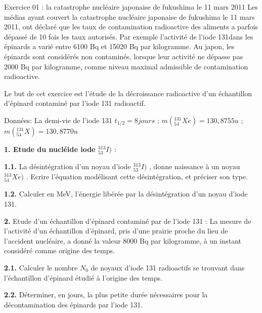 \documentclass[12pt, french]{article}
\begin{document}
\begin{center}
\end{center}

\vspace{-0.2cm}



\begin{Box2}{Exercice 01 : la catastrophe nucléaire japonaise de fukushima le 11 mars 2011  }
	Les médias ayant couvert la catastrophe nucléaire japonaise de fukushima le 11 mars 2011, ont déclaré
que les taux de contamination radioactive des aliments a parfois dépassé de 10 fois les taux autorisés.
Par exemple l’activité de l’iode 131dans les épinards a varié entre 6100 Bq et 15020 Bq par
kilogramme. Au japon, les épinards sont considérés non contaminés, lorsque leur activité ne dépasse
pas 2000 Bq par kilogramme, comme niveau maximal admissible de contamination radioactive.

Le but de cet exercice est l’étude de la décroissance radioactive d’un échantillon d’épinard contaminé
par l’iode 131 radioactif. 

Données: La demi-vie de l’iode 131 $t_{1/2}=8jours$ ; $m(^{131}_{54}Xe)=130,8755u $ ; $m(^{131}_{54}X)=130,8770u $

\textbf{1. Etude du nucléide iode $^{313}_{53}I)$ } : 

\textbf{1.1. }La désintégration d’un noyau d’iode $^{313}_{53}I)$ , donne naissance à un noyau $^{313}_{54}Xe)$ . Ecrire l’équation modélisant cette désintégration, et préciser son type.

\textbf{1.2. }Calculer en MeV, l’énergie libérée par la désintégration d’un noyau d’iode 131.

\textbf{2. } Etude d’un échantillon d’épinard contaminé par de l’iode 131 : La mesure de l’activité d’un
échantillon d’épinard, pris d’une prairie proche du lieu de l’accident nucléaire, a donné la valeur 8000 Bq par kilogramme, à un instant considéré comme origine des temps.

\textbf{2.1. } Calculer le nombre $N_0$ de noyaux d’iode 131 radioactifs se trouvant dans l’échantillon
d’épinard étudié à l’origine des temps.

\textbf{2.2. } Déterminer, en jours, la plus petite durée nécessaires pour la décontamination des épinards
par l’iode 131.
\end{Box2}
\end{document}
